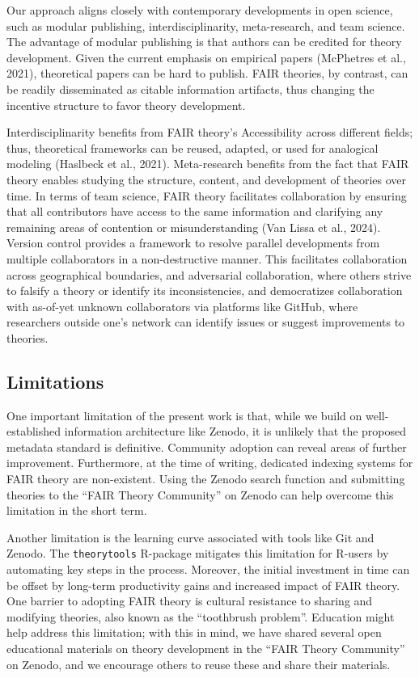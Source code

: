 \documentclass[
  man, noextraspace,floatsintext]{apa7}
\begin{document}
Our approach aligns closely with contemporary developments in open science,
such as modular publishing, interdisciplinarity, meta-research, and team science.
The advantage of modular publishing is that authors can be credited for theory development.
Given the current emphasis on empirical papers (McPhetres et al., 2021), theoretical papers can be hard to publish.
FAIR theories, by contrast, can be readily disseminated as citable information artifacts, thus changing the incentive structure to favor theory development.

Interdisciplinarity benefits from FAIR theory's Accessibility across different fields; thus, theoretical frameworks can be reused, adapted, or used for analogical modeling (Haslbeck et al., 2021).
Meta-research benefits from the fact that FAIR theory enables studying the structure, content, and development of theories over time.
In terms of team science, FAIR theory facilitates collaboration by ensuring that all contributors have access to the same information and
clarifying any remaining areas of contention or misunderstanding (Van Lissa et al., 2024).
Version control provides a framework to resolve parallel developments from multiple collaborators in a non-destructive manner.
This facilitates collaboration across geographical boundaries,
and adversarial collaboration, where others strive to falsify a theory or identify its inconsistencies, and democratizes collaboration with as-of-yet unknown collaborators via platforms like GitHub, where researchers outside one's network can identify issues or suggest improvements to theories.

\subsection{Limitations}\label{limitations}

One important limitation of the present work is that,
while we build on well-established information architecture like Zenodo,
it is unlikely that the proposed metadata standard is definitive.
Community adoption can reveal areas of further improvement.
Furthermore, at the time of writing, dedicated indexing systems for FAIR theory are non-existent.
Using the Zenodo search function and submitting theories to the ``FAIR Theory Community'' on Zenodo can help overcome this limitation in the short term.

Another limitation is the learning curve associated with tools like Git and Zenodo.
The \texttt{theorytools} R-package mitigates this limitation for R-users by automating key steps in the process.
Moreover, the initial investment in time can be offset by long-term productivity gains and increased impact of FAIR theory.
One barrier to adopting FAIR theory is cultural resistance to sharing and modifying theories, also known as the ``toothbrush problem''.
Education might help address this limitation; with this in mind,
we have shared several open educational materials on theory development in the ``FAIR Theory Community'' on Zenodo, and we encourage others to reuse these and share their materials.
\end{document}
